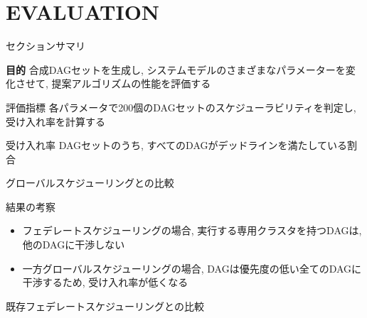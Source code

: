 
\section{EVALUATION}
\label{sec: evaluation}

\begin{frame}{セクションサマリ}
    \begin{itembox}[l]{\textbf{目的}}
        合成DAGセットを生成し, システムモデルのさまざまなパラメーターを変化させて, 提案アルゴリズムの性能を評価する
    \end{itembox}
\end{frame}

\begin{frame}{評価指標}
    各パラメータで200個のDAGセットのスケジューラビリティを判定し, 受け入れ率を計算する
    \begin{block}{受け入れ率}
        DAGセットのうち, すべてのDAGがデッドラインを満たしている割合
    \end{block}
\end{frame}

\begin{frame}{グローバルスケジューリングとの比較}
\end{frame}

\begin{frame}{結果の考察}
    \begin{itemize}
        \item フェデレートスケジューリングの場合, 実行する専用クラスタを持つDAGは, 他のDAGに干渉しない
        \item 一方グローバルスケジューリングの場合, DAGは優先度の低い全てのDAGに干渉するため, 受け入れ率が低くなる
    \end{itemize}
\end{frame}

\begin{frame}{既存フェデレートスケジューリングとの比較}
\end{frame}
